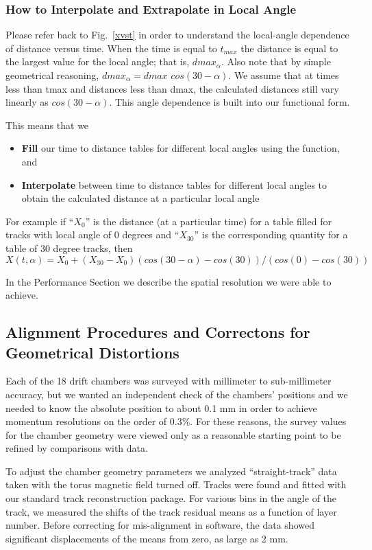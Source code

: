 \subsubsection{How to Interpolate and Extrapolate in Local Angle}
Please refer back to Fig.~\ref{xvst} in order to understand the local-angle dependence
of distance versus time.  When the time is equal to $t_{max}$ the distance is equal to
the largest value for the local angle; that is, $dmax_{\alpha}$.  Also note that by
simple geometrical reasoning, $dmax_{\alpha} = dmax$  $cos(30-\alpha)$.
We assume that at times less than tmax and distances less than dmax, the calculated
distances still vary linearly as $cos(30-\alpha)$.  This angle dependence is built into
our functional form.

This means that we
\begin{itemize}
\item {\bf Fill} our time to distance tables for different local angles using the function, and
\item {\bf Interpolate} between time to distance tables for different local angles to obtain
the calculated distance at a particular local angle
\end{itemize}
For example if ``$X_0$'' is the distance (at a particular time) for a table filled for tracks with local angle of 0 degrees
and ``$X_{30}$'' is the corresponding quantity for a table of 30 degree tracks, then
\begin{equation} 
\label{eq-extrap30}
X(t,\alpha) = X_0 + (X_{30}-X_0) (cos(30-\alpha) - cos(30)) / (cos(0) - cos(30))
\end{equation}

In the Performance Section we describe the spatial resolution we were able to achieve.

\subsection{Alignment Procedures and Correctons for Geometrical Distortions}
\label{align}

Each of the 18 drift chambers was 
surveyed with millimeter to sub-millimeter
accuracy, but we wanted an independent check of the chambers' positions and 
we needed to know the absolute position to about 0.1 mm in order to 
achieve momentum resolutions on the order of 0.3\%.  For 
these reasons, the survey values for the chamber geometry were viewed only as 
a reasonable starting point to be refined by comparisons with data.

To adjust the chamber geometry parameters we analyzed
``straight-track'' data taken with the torus magnetic field turned off.  
Tracks were found and fitted with our standard track reconstruction package.
For various bins in the angle of the track, we measured the shifts of the
track residual means as a function of layer number. 
Before correcting for mis-alignment in software, the data showed significant 
displacements of the means from zero, as large as 2 mm.  

